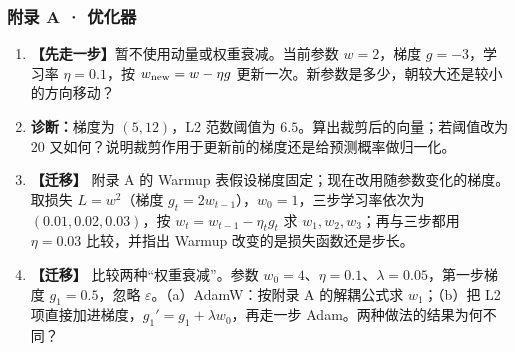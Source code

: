\subsubsection*{附录 A · 优化器}
\begin{enumerate}[label={},leftmargin=4.8em,itemsep=4pt]
\item[\textbf{C-140.}] \leavevmode{}\label{exercise:C-140}\label{exercise:optimizer-basic-step}\textbf{【先走一步】}暂不使用动量或权重衰减。当前参数 $w=2$，梯度 $g=-3$，学习率 $\eta=0.1$，按 $w_{\rm new}=w-\eta g$ 更新一次。新参数是多少，朝较大还是较小的方向移动？
\item[\textbf{C-141.}] \leavevmode{}\label{exercise:C-141}\label{exercise:optimizer-clipping}\textbf{诊断：}梯度为 $(5,12)$，L2 范数阈值为 $6.5$。算出裁剪后的向量；若阈值改为 $20$ 又如何？说明裁剪作用于更新前的梯度还是给预测概率做归一化。
\item[\textbf{C-142.}] \leavevmode{}\label{exercise:C-142}\label{exercise:optimizer-warmup}\label{exercise:warmup-schedule} \textbf{【迁移】} 附录 A 的 Warmup 表假设梯度固定；现在改用随参数变化的梯度。取损失 $L=w^2$（梯度 $g_t=2w_{t-1}$），$w_0=1$，三步学习率依次为 $(0.01,0.02,0.03)$，按 $w_t=w_{t-1}-\eta_tg_t$ 求 $w_1,w_2,w_3$；再与三步都用 $\eta=0.03$ 比较，并指出 Warmup 改变的是损失函数还是步长。
\item[\textbf{C-143.}] \leavevmode{}\label{exercise:C-143}\label{exercise:optimizer-adamw}\label{exercise:adamw-decay} \textbf{【迁移】} 比较两种“权重衰减”。参数 $w_0=4$、$\eta=0.1$、$\lambda=0.05$，第一步梯度 $g_1=0.5$，忽略 $\varepsilon$。（a）AdamW：按附录 A 的解耦公式求 $w_1$；（b）把 L2 项直接加进梯度，$g_1'=g_1+\lambda w_0$，再走一步 Adam。两种做法的结果为何不同？
\end{enumerate}
